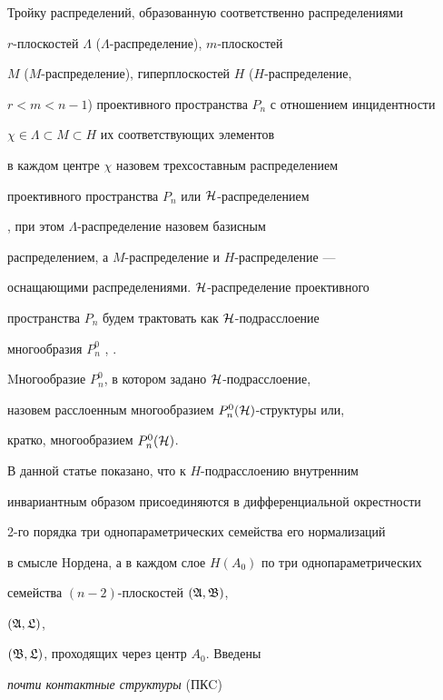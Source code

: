 \label{begin}











Тройку распределений, образованную соответственно распределениями


$r$-плоскостей $\Lambda$ ($\Lambda$-распределение), $m$-плоскостей


$M$ ($M$-распределение), гиперплоскостей $H$ ($H$-распределение,


$r<m<n-1$) проективного пространства $P_n$ с отношением инцидентности


$\chi \in \Lambda \subset M\subset H$ их соответствующих элементов


в каждом центре $\chi$ назовем трехсоставным распределением


проективного пространства $P_n$ или $\cal H$-распределением


\cite{rab1}, при этом $\Lambda$-распределение назовем базисным


распределением, а $M$-распределение и $H$-распределение ---


оснащающими распределениями.\; $\cal H$-распределение проективного


пространства $P_n$ будем трактовать как $\cal H$-подрасслоение


многообразия $P_n^0$ \cite{rab1}, \cite{rab2}.


Mногообразие $P_n^0$, в котором задано $\cal H$-подрасслоение,


назовем расслоенным многообразием $P_n^0(\cal H)$-структуры или,


кратко, многообразием $P_n^0(\cal H)$.





В данной статье показано, что к $H$-подрасслоению внутренним


инвариантным образом присоединяются в дифференциальной окрестности


2-го порядка три однопараметрических семейства его нормализаций


в смысле Hордена, а в каждом слое $H(A_0)$ по три однопараметрических


семейства $(n-2)$-плоскостей $(\frak A, \frak B)$,


$(\frak A, \frak L)$,


$(\frak B, \frak L)$, проходящих через центр $A_0$. Введены 


{\it почти контактные структуры} (ПКC)\label{ACS}


